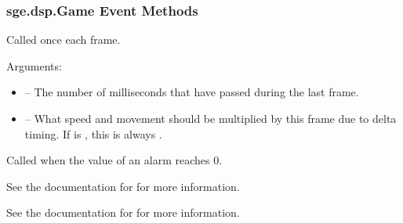 \documentclass[letterpaper,10pt,english]{sphinxmanual}
\begin{document}
\subsubsection{sge.dsp.Game Event Methods}
\label{dsp:sge-dsp-game-event-methods}

\begin{fulllineitems}
\label{dsp:sge.dsp.Game.event_step}
Called once each frame.

Arguments:
\begin{itemize}
\item {} 
 -- The number of milliseconds that have passed
during the last frame.

\item {} 
 -- What speed and movement should be multiplied
by this frame due to delta timing.  If {\hyperref[dsp:sge.dsp.Game.delta]{\emph{}}} is
, this is always .

\end{itemize}

\end{fulllineitems}


\begin{fulllineitems}
\label{dsp:sge.dsp.Game.event_alarm}
Called when the value of an alarm reaches 0.

See the documentation for {\hyperref[dsp:sge.dsp.Game.alarms]{\emph{}}} for more
information.

\end{fulllineitems}


\begin{fulllineitems}
\label{dsp:sge.dsp.Game.event_key_press}
See the documentation for {\hyperref[input:sge.input.KeyPress]{\emph{}}} for more
information.

\end{fulllineitems}

\end{document}

